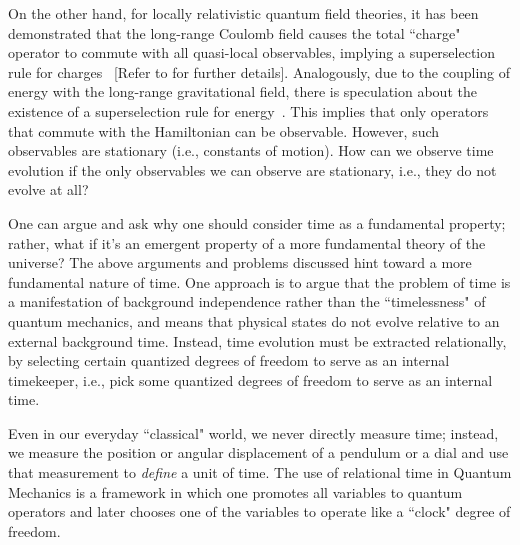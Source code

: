 On the other hand, for locally relativistic quantum field theories, it has been demonstrated that the 
long-range Coulomb field causes the total ``charge" operator to commute with all quasi-local observables, 
implying a superselection rule for charges~\cite{Strocchi:1974xh} [Refer to  
for further details]. Analogously, due to the coupling of energy with the long-range gravitational 
field, there is speculation about the existence of a superselection rule for energy~\cite{page1983evolution}. 
This implies that only operators that commute with the Hamiltonian can be observable. However, such 
observables are stationary (i.e., constants of motion). How can we observe time evolution if the 
only observables we can observe are stationary, i.e., they do not evolve at all?

One can argue and ask why one should consider time as a fundamental property; rather, what if 
it's an emergent property of a more fundamental theory of the universe? The above arguments and 
problems discussed hint toward a more fundamental nature of time. One approach is to argue that 
the problem of time is a manifestation of background independence rather than the ``timelessness" 
of quantum mechanics, and means that physical states do not evolve relative to an external background 
time. Instead, time evolution must be extracted relationally, by selecting certain quantized degrees 
of freedom to serve as an internal timekeeper, i.e., pick some quantized degrees of freedom to serve 
as an internal time.

Even in our everyday ``classical" world, we never directly measure time; instead, we measure the 
position or angular displacement of a pendulum or a dial and use that measurement to \emph{define} a 
unit of time. The use of relational time in Quantum Mechanics is a framework in which one promotes 
all variables to quantum operators and later chooses one of the variables to operate like a    
``clock" degree of freedom.

